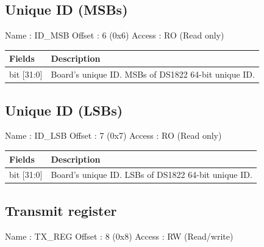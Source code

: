 \documentclass[11pt,a4paper]{article}
\begin{document}
\subsection{Unique ID (MSBs)}

Name   : ID\_MSB \newline
Offset : 6 (0x6) \newline
Access : RO (Read only) \newline

\begin{table}[h!]
  \begin{tabularx}{\textwidth}{ l X }
    \hline
    \textbf{Fields} & \textbf{Description}\\
    \hline
    bit [31:0]  & Board's unique ID. MSBs of DS1822 64-bit unique ID. \\
    \hline
  \end{tabularx}
\end{table}

\subsection{Unique ID (LSBs)}

Name   : ID\_LSB \newline
Offset : 7 (0x7) \newline
Access : RO (Read only) \newline

\begin{table}[h!]
  \begin{tabularx}{\textwidth}{ l X }
    \hline
    \textbf{Fields} & \textbf{Description}\\
    \hline
    bit [31:0]  & Board's unique ID. LSBs of DS1822 64-bit unique ID. \\
    \hline
  \end{tabularx}
\end{table}

\subsection{Transmit register}

Name   : TX\_REG \newline
Offset : 8 (0x8) \newline
Access : RW (Read/write) \newline
\end{document}
